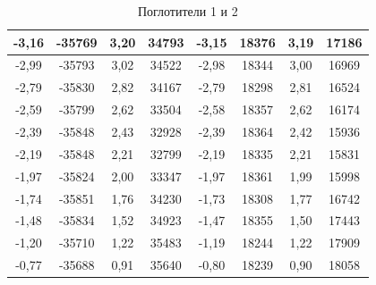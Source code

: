 \documentclass[a4paper,12pt]{article}
\theoremstyle{definition}
\begin{document}
\begin{table}[h]
\begin{tabular}{|c|c|c|c|c|c|c|c|}
-3,16         & -35769        & 3,20          & 34793         & -3,15         & 18376         & 3,19          & 17186        \\ \hline
-2,99         & -35793        & 3,02          & 34522         & -2,98         & 18344         & 3,00          & 16969        \\ \hline
-2,79         & -35830        & 2,82          & 34167         & -2,79         & 18298         & 2,81          & 16524        \\ \hline
-2,59         & -35799        & 2,62          & 33504         & -2,58         & 18357         & 2,62          & 16174        \\ \hline
-2,39         & -35848        & 2,43          & 32928         & -2,39         & 18364         & 2,42          & 15936        \\ \hline
-2,19         & -35848        & 2,21          & 32799         & -2,19         & 18335         & 2,21          & 15831        \\ \hline
-1,97         & -35824        & 2,00          & 33347         & -1,97         & 18361         & 1,99          & 15998        \\ \hline
-1,74         & -35851        & 1,76          & 34230         & -1,73         & 18308         & 1,77          & 16742        \\ \hline
-1,48         & -35834        & 1,52          & 34923         & -1,47         & 18355         & 1,50          & 17443        \\ \hline
-1,20         & -35710        & 1,22          & 35483         & -1,19         & 18244         & 1,22          & 17909        \\ \hline
-0,77         & -35688        & 0,91          & 35640         & -0,80         & 18239         & 0,90          & 18058        \\ \hline
\end{tabular}
\caption{Поглотители 1 и 2}
\centering
\end{table}

$ $
\end{document}

